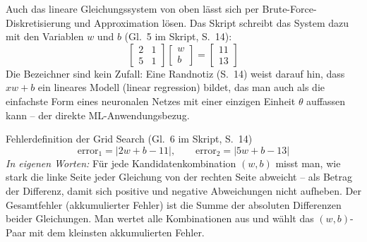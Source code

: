 Auch das lineare Gleichungssystem von oben lässt sich per Brute-Force-Diskretisierung und Approximation lösen. Das Skript schreibt das System dazu mit den Variablen $w$ und $b$ (Gl.~5 im Skript, S.~14):
\[
\begin{bmatrix} 2 & 1 \\ 5 & 1 \end{bmatrix}
\begin{bmatrix} w \\ b \end{bmatrix}
=
\begin{bmatrix} 11 \\ 13 \end{bmatrix}
\]
Die Bezeichner sind kein Zufall: Eine Randnotiz (S.~14) weist darauf hin, dass $xw + b$ ein lineares Modell (linear regression) bildet, das man auch als die einfachste Form eines neuronalen Netzes mit einer einzigen Einheit $\theta$ auffassen kann -- der direkte ML-Anwendungsbezug.

\begin{satzbox}{Fehlerdefinition der Grid Search (Gl.~6 im Skript, S.~14)}
\[
\text{error}_1 = |2w + b - 11|, \qquad \text{error}_2 = |5w + b - 13|
\]
\emph{In eigenen Worten:} Für jede Kandidatenkombination $(w,b)$ misst man, wie stark die linke Seite jeder Gleichung von der rechten Seite abweicht -- als Betrag der Differenz, damit sich positive und negative Abweichungen nicht aufheben. Der Gesamtfehler (akkumulierter Fehler) ist die Summe der absoluten Differenzen beider Gleichungen. Man wertet alle Kombinationen aus und wählt das $(w,b)$-Paar mit dem kleinsten akkumulierten Fehler.
\end{satzbox}

